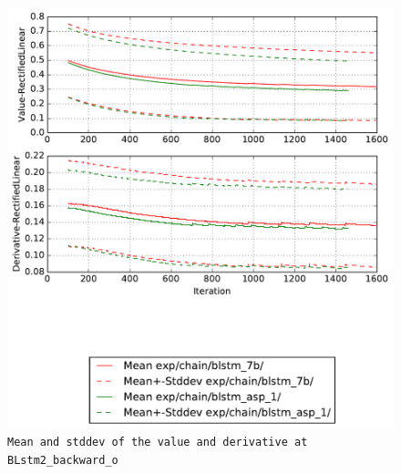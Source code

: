 \documentclass[prl,10pt,twocolumn]{revtex4}
\begin{document}
\newpage
\begin{figure}[h]
  \begin{center}
    \caption{\texttt{Mean and stddev of the value and derivative at BLstm2\_backward\_o}}
    \includegraphics[width=\textwidth]{exp/chain/blstm_7b/report/nonlinstats_BLstm2_backward_o.pdf}
  \end{center}
\end{figure}
\clearpage
\end{document}
